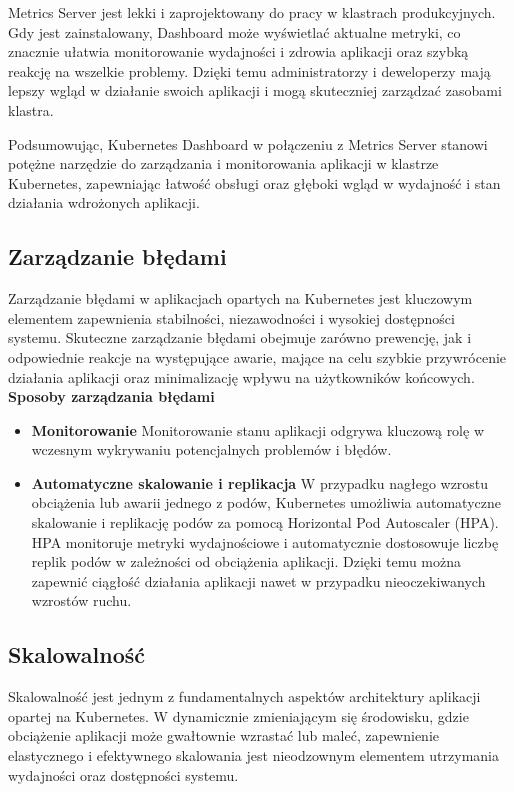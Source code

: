 \documentclass[12pt,a4paper]{article}
\begin{document}
Metrics Server jest lekki i zaprojektowany do pracy w klastrach produkcyjnych. Gdy jest zainstalowany, Dashboard może wyświetlać aktualne metryki, co znacznie ułatwia monitorowanie wydajności i zdrowia aplikacji oraz szybką reakcję na wszelkie problemy. Dzięki temu administratorzy i deweloperzy mają lepszy wgląd w działanie swoich aplikacji i mogą skuteczniej zarządzać zasobami klastra.

Podsumowując, Kubernetes Dashboard w połączeniu z Metrics Server stanowi potężne narzędzie do zarządzania i monitorowania aplikacji w klastrze Kubernetes, zapewniając łatwość obsługi oraz głęboki wgląd w wydajność i stan działania wdrożonych aplikacji.
\newpage
\subsection{Zarządzanie błędami}
\label{sec:ERD} 
Zarządzanie błędami w aplikacjach opartych na Kubernetes jest kluczowym elementem zapewnienia stabilności, niezawodności i wysokiej dostępności systemu. Skuteczne zarządzanie błędami obejmuje zarówno prewencję, jak i odpowiednie reakcje na występujące awarie, mające na celu szybkie przywrócenie działania aplikacji oraz minimalizację wpływu na użytkowników końcowych.
\textbf{Sposoby zarządzania błędami}
\begin{itemize}
    \item \textbf{Monitorowanie} Monitorowanie stanu aplikacji odgrywa kluczową rolę w wczesnym wykrywaniu potencjalnych problemów i błędów.
    \item \textbf{Automatyczne skalowanie i replikacja} W przypadku nagłego wzrostu obciążenia lub awarii jednego z podów, Kubernetes umożliwia automatyczne skalowanie i replikację podów za pomocą Horizontal Pod Autoscaler (HPA). HPA monitoruje metryki wydajnościowe i automatycznie dostosowuje liczbę replik podów w zależności od obciążenia aplikacji. Dzięki temu można zapewnić ciągłość działania aplikacji nawet w przypadku nieoczekiwanych wzrostów ruchu.
\end{itemize}

\subsection{Skalowalność}
\label{sec:ExamplesSection}
Skalowalność jest jednym z fundamentalnych aspektów architektury aplikacji opartej na Kubernetes. W dynamicznie zmieniającym się środowisku, gdzie obciążenie aplikacji może gwałtownie wzrastać lub maleć, zapewnienie elastycznego i efektywnego skalowania jest nieodzownym elementem utrzymania wydajności oraz dostępności systemu.
\end{document}
